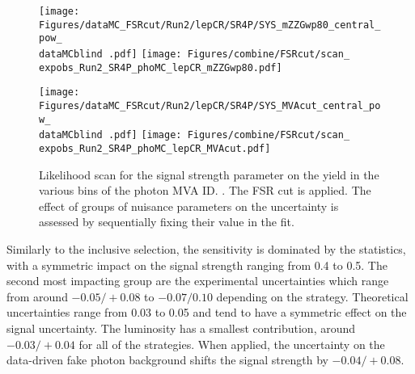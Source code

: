 \begin{figure}
  \texttt{[image: Figures/dataMC\_FSRcut/Run2/lepCR/SR4P/SYS\_mZZGwp80\_central\_pow\_\\dataMCblind .pdf]}
  \hfill
  \centering
  \texttt{[image: Figures/combine/FSRcut/scan\_\\expobs\_Run2\_SR4P\_phoMC\_lepCR\_mZZGwp80.pdf]}
  \caption{}
  \label{fig:scan_FSRcut_Run2_SR4P_phoMC_lepCR_mZZGwp80}
\end{figure}

\begin{figure}
  \centering
  \texttt{[image: Figures/dataMC\_FSRcut/Run2/lepCR/SR4P/SYS\_MVAcut\_central\_pow\_\\dataMCblind .pdf]}
  \hfill
  \texttt{[image: Figures/combine/FSRcut/scan\_\\expobs\_Run2\_SR4P\_phoMC\_lepCR\_MVAcut.pdf]}
  \caption{Likelihood scan for the signal strength parameter
    on the yield in the various bins of the photon MVA ID.
    .
    The FSR cut is applied.
    The effect of groups of nuisance parameters on the uncertainty is assessed by sequentially fixing their value in the fit.
  }
  \label{fig:scan_FSRcut_Run2_SR4P_phoMC_lepCR_MVAcut}
\end{figure}

Similarly to the inclusive selection, the sensitivity is dominated by the statistics,
with a symmetric impact on the signal strength ranging from 0.4 to 0.5.
The second most impacting group are the experimental uncertainties
which range from around $-0.05/+0.08$ to $-0.07/0.10$ depending on the strategy.
Theoretical uncertainties range from 0.03 to 0.05 and tend to have a symmetric effect on the signal uncertainty.
The luminosity has a smallest contribution, around $-0.03/+0.04$ for all of the strategies.
When applied, the uncertainty on the data-driven fake photon background shifts the signal strength by $-0.04/+0.08$.

